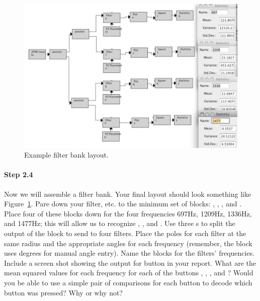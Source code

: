\begin{figure}
  \begin{center}
    \includegraphics[width=6in]{lab7/screen}
  \end{center}
  \caption{Example filter bank layout.\label{fg:screen}}
\end{figure}

\paragraph{Step 2.4} Now we will assemble a filter bank. Your final layout 
should look something like Figure~\ref{fg:screen}. Pare down
your filter, etc. to the minimum set of blocks: ,
, , and . Place four of these blocks down for
the four frequencies 697Hz, 1209Hz, 1336Hz, and 1477Hz; this will
allow us to recognize , , and . Use
three s to split the output of the 
block to send to four filters. Place the poles for each filter at the
same radius and the appropriate angles for each frequency (remember,
the  block uses degrees for manual angle
entry). Name the  blocks for the filters'
frequencies. Include a screen shot showing the output for
 button  in your report. What are the mean
squared values for each frequency for each of the 
buttons , , , and ?  Would you
be able to use a simple pair of comparisons for each button to decode
which button was pressed? Why or why not?

